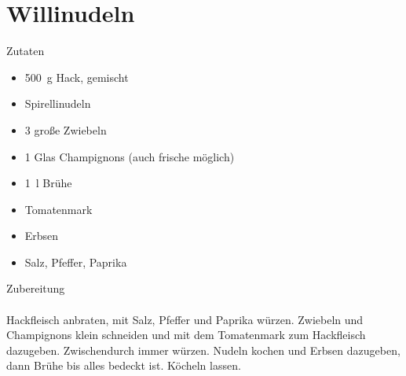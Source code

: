 \section*{Willinudeln}
\ihead{}\ohead{}
\cfoot{}
{\Large Zutaten}
\begin{multicols}{2}
\begin{itemize}
    \item \SI{500}{g} Hack, gemischt
    \item Spirellinudeln
    \item \num{3} große Zwiebeln
    \item \num{1} Glas Champignons (auch frische möglich)
    \item \SI{1}{l} Brühe
    \item Tomatenmark
    \item Erbsen
    \item Salz, Pfeffer, Paprika
\end{itemize}
\end{multicols}
\noindent
{\Large Zubereitung}\\
\\
Hackfleisch anbraten, mit Salz, Pfeffer und Paprika würzen. 
Zwiebeln und Champignons klein schneiden und mit dem Tomatenmark zum Hackfleisch dazugeben.
Zwischendurch immer würzen.
Nudeln kochen und Erbsen dazugeben, dann Brühe bis alles bedeckt ist.
Köcheln lassen.